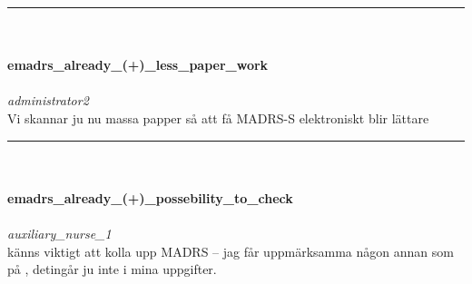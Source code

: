 \documentclass[12pt,a4paper,oneside]{article}
\begin{document}
\hrule
\ \\\ \\{\bf emadrs\_already\_(+)\_less\_paper\_work }
\\\ \\%
 { \it \it administrator2 %
}\\ 
Vi skannar ju nu massa papper s{\aa} att f{\aa} MADRS-S elektroniskt blir l{\"a}ttare %


\hrule
\ \\\ \\{\bf emadrs\_already\_(+)\_possebility\_to\_check }
\\\ \\%
 { \it \it auxiliary\_nurse\_1 %
}\\ 
 k{\"a}nns viktigt att kolla upp MADRS -- jag f{\aa}r uppm{\"a}rksamma n{\aa}gon annan som p{\aa} , deting{\aa}r ju inte i mina uppgifter. %
\end{document}
